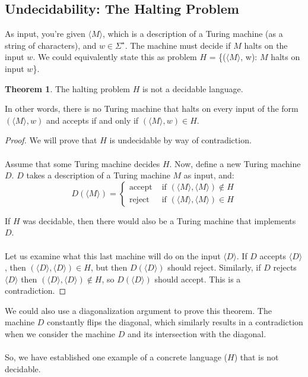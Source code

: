 \documentclass[]{article}
\theoremstyle{definition}
\newtheorem*{theorem}{Theorem}
\begin{document}
  \subsection{Undecidability: The Halting Problem}
    As input, you're given $\langle M \rangle$, which is a description of a Turing machine (as a string of characters), and $w \in \Sigma^\star$. The machine must decide if $M$ halts on the input $w$. We could equivalently state this as problem $H$ = \{($\langle M \rangle$, w): $M$ halts on input $w$\}.

    \begin{theorem}
      The halting problem $H$ is not a decidable language.
    \end{theorem}

    In other words, there is no Turing machine that halts on every input of the form $(\langle M \rangle, w)$ and accepts if and only if $(\langle M \rangle, w) \in H$.

     \begin{proof}
      We will prove that $H$ is undecidable by way of contradiction.
      \\ \\
      Assume that some Turing machine decides $H$. Now, define a new Turing machine $D$. $D$ takes a description of a Turing machine $M$ as input, and:
      $$
        D(\langle M \rangle) = \begin{cases}
          \text{accept } & \text{if } (\langle M \rangle, \langle M \rangle) \not \in H \\
          \text{reject } & \text{if } (\langle M \rangle, \langle M \rangle) \in H
        \end{cases}
      $$

      If $H$ was decidable, then there would also be a Turing machine that implements $D$.
      \\ \\
      Let us examine what this last machine will do on the input $\langle D \rangle$. If $D$ accepts $\langle D \rangle$, then $(\langle D \rangle, \langle D \rangle) \in H$, but then $D(\langle D \rangle)$ should reject. Similarly, if $D$ rejects $\langle D \rangle$ then $(\langle D \rangle, \langle D \rangle) \not \in H$, so $D(\langle D \rangle)$ should accept. This is a contradiction.
    \end{proof}

    We could also use a diagonalization argument to prove this theorem. The machine $D$ constantly flips the diagonal, which similarly results in a contradiction when we consider the machine $D$ and its intersection with the diagonal.
    \\ \\
    So, we have established one example of a concrete language ($H$) that is not decidable.
\end{document}
